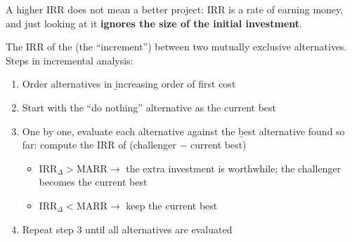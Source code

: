 \begin{remark}
    A higher IRR does not mean a better project: IRR is a rate of earning
    money, and just looking at it \textbf{ignores the size of the initial
    investment}.
\end{remark}

\begin{definition}
    The IRR of the  (the ``increment'') between two mutually
    exclusive alternatives. Steps in incremental analysis:
    \begin{enumerate}
        \item Order alternatives in \b{increasing order of first cost}
        \item Start with the ``do nothing'' alternative as the current best
        \item One by one, evaluate each alternative against the \b{best alternative found so far}: compute the IRR of (challenger $-$ current best)
        \begin{itemize}
            \item $\text{IRR}_\Delta > \text{MARR} \to$ the extra investment is worthwhile; the challenger becomes the current best
            \item $\text{IRR}_\Delta < \text{MARR} \to$ keep the current best
        \end{itemize}
        \item Repeat step 3 until all alternatives are evaluated
    \end{enumerate}
\end{definition}

